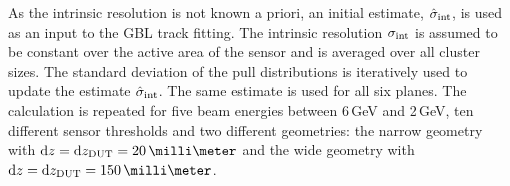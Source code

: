 As the intrinsic resolution is not known a priori, an initial estimate, $\hat{\sigma}_{\textrm{int}}$, is used as an input to the GBL track fitting. 
The intrinsic resolution $\sigma_{\textrm{int}}$ is assumed to be constant over the active area of the sensor and is averaged over all cluster sizes. 
The standard deviation of the pull distributions is iteratively used to update the estimate $\hat{\sigma}_{\textrm{int}}$. 
The same estimate is used for all six planes. 
The calculation is repeated for five beam energies between 6\,GeV and 2\,GeV, ten different sensor thresholds
 and two different geometries: the narrow geometry with $\dz = \dzdut = 20\,\milli\meter$ and the wide geometry with $\dz = \dzdut = 150\,\milli\meter$.

